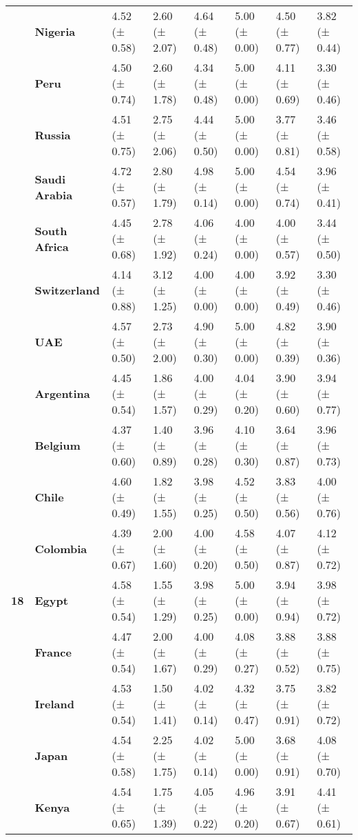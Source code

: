 \begin{longtable}{llllllll}
\textbf{} & \textbf{Nigeria} & 4.52 (± 0.58) & 2.60 (± 2.07) & 4.64 (± 0.48) & 5.00 (± 0.00) & 4.50 (± 0.77) & 3.82 (± 0.44) \\
\textbf{} & \textbf{Peru} & 4.50 (± 0.74) & 2.60 (± 1.78) & 4.34 (± 0.48) & 5.00 (± 0.00) & 4.11 (± 0.69) & 3.30 (± 0.46) \\
\textbf{} & \textbf{Russia} & 4.51 (± 0.75) & 2.75 (± 2.06) & 4.44 (± 0.50) & 5.00 (± 0.00) & 3.77 (± 0.81) & 3.46 (± 0.58) \\
\textbf{} & \textbf{Saudi Arabia} & 4.72 (± 0.57) & 2.80 (± 1.79) & 4.98 (± 0.14) & 5.00 (± 0.00) & 4.54 (± 0.74) & 3.96 (± 0.41) \\
\textbf{} & \textbf{South Africa} & 4.45 (± 0.68) & 2.78 (± 1.92) & 4.06 (± 0.24) & 4.00 (± 0.00) & 4.00 (± 0.57) & 3.44 (± 0.50) \\
\textbf{} & \textbf{Switzerland} & 4.14 (± 0.88) & 3.12 (± 1.25) & 4.00 (± 0.00) & 4.00 (± 0.00) & 3.92 (± 0.49) & 3.30 (± 0.46) \\
\textbf{} & \textbf{UAE} & 4.57 (± 0.50) & 2.73 (± 2.00) & 4.90 (± 0.30) & 5.00 (± 0.00) & 4.82 (± 0.39) & 3.90 (± 0.36) \\
\cline{1-8}
\multirow[t]{19}{*}{\textbf{18}} & \textbf{Argentina} & 4.45 (± 0.54) & 1.86 (± 1.57) & 4.00 (± 0.29) & 4.04 (± 0.20) & 3.90 (± 0.60) & 3.94 (± 0.77) \\
\textbf{} & \textbf{Belgium} & 4.37 (± 0.60) & 1.40 (± 0.89) & 3.96 (± 0.28) & 4.10 (± 0.30) & 3.64 (± 0.87) & 3.96 (± 0.73) \\
\textbf{} & \textbf{Chile} & 4.60 (± 0.49) & 1.82 (± 1.55) & 3.98 (± 0.25) & 4.52 (± 0.50) & 3.83 (± 0.56) & 4.00 (± 0.76) \\
\textbf{} & \textbf{Colombia} & 4.39 (± 0.67) & 2.00 (± 1.60) & 4.00 (± 0.20) & 4.58 (± 0.50) & 4.07 (± 0.87) & 4.12 (± 0.72) \\
\textbf{} & \textbf{Egypt} & 4.58 (± 0.54) & 1.55 (± 1.29) & 3.98 (± 0.25) & 5.00 (± 0.00) & 3.94 (± 0.94) & 3.98 (± 0.72) \\
\textbf{} & \textbf{France} & 4.47 (± 0.54) & 2.00 (± 1.67) & 4.00 (± 0.29) & 4.08 (± 0.27) & 3.88 (± 0.52) & 3.88 (± 0.75) \\
\textbf{} & \textbf{Ireland} & 4.53 (± 0.54) & 1.50 (± 1.41) & 4.02 (± 0.14) & 4.32 (± 0.47) & 3.75 (± 0.91) & 3.82 (± 0.72) \\
\textbf{} & \textbf{Japan} & 4.54 (± 0.58) & 2.25 (± 1.75) & 4.02 (± 0.14) & 5.00 (± 0.00) & 3.68 (± 0.91) & 4.08 (± 0.70) \\
\textbf{} & \textbf{Kenya} & 4.54 (± 0.65) & 1.75 (± 1.39) & 4.05 (± 0.22) & 4.96 (± 0.20) & 3.91 (± 0.67) & 4.41 (± 0.61) \\

\end{longtable}
